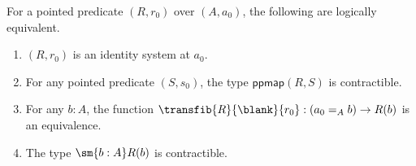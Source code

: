 %
\begin{thm}\label{thm:identity-systems}
  For a pointed predicate $(R,r_0)$ over $(A,a_0)$, the following are logically equivalent.
  \begin{enumerate}
  \item $(R,r_0)$ is an identity system at $a_0$.\label{item:identity-systems1}
  \item For any pointed predicate $(S,s_0)$, the type $\mathsf{ppmap}(R,S)$ is contractible.\label{item:identity-systems2}
  \item For any $b:A$, the function $\transfib{R}{\blank}{r_0} : (a_0 =_A b) \to R(b)$ is an equivalence.\label{item:identity-systems3}
  \item The type $\sm{b:A} R(b)$ is contractible.\label{item:identity-systems4}
  \end{enumerate}
\end{thm}


